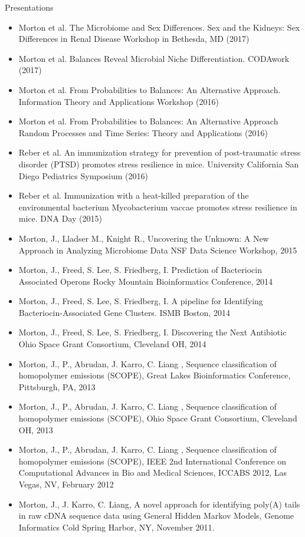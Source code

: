 \documentclass{resume} %
\begin{document}
\begin{rSection}{Presentations}
  \begin{itemize}
    \setlength\itemsep{0em}
    \item  Morton et al. The Microbiome and Sex Differences.
           Sex and the Kidneys: Sex Differences in Renal Disease Workshop in Bethesda, MD (2017)
    \item  Morton et al. Balances Reveal Microbial Niche Differentiation. CODAwork (2017)
    \item  Morton et al. From Probabilities to Balances: An Alternative Approach. Information Theory and Applications Workshop (2016)
    \item  Morton et al. From Probabilities to Balances: An Alternative Approach Random Processes and Time Series: Theory and Applications (2016)
    \item  Reber et al. An immunization strategy for prevention of post-traumatic stress disorder (PTSD) promotes stress resilience in mice.
                 University California San Diego Pediatrics Symposium  (2016)
    \item  Reber et al. Immunization with a heat-killed preparation of the environmental bacterium Mycobacterium vaccae
                promotes stress resilience in mice. DNA Day (2015)
    \item   Morton, J., Lladser M., Knight R., Uncovering the Unknown: A New Approach in
                Analyzing Microbiome Data NSF Data Science Workshop, 2015
    \item   Morton, J., Freed, S. Lee, S. Friedberg, I. Prediction of Bacteriocin Associated Operons
                Rocky Mountain Bioinformatics Conference, 2014
    \item   Morton, J., Freed, S. Lee, S. Friedberg, I. A pipeline for Identifying Bacteriocin-Associated
                Gene Clusters. ISMB Boston, 2014
    \item   Morton, J., Freed, S. Lee, S. Friedberg, I. Discovering the Next Antibiotic
                Ohio Space Grant Consortium, Cleveland OH, 2014
    \item   Morton, J., P., Abrudan, J. Karro, C. Liang , Sequence classification of homopolymer emissions
                (SCOPE), Great Lakes Bioinformatics Conference, Pittsburgh, PA, 2013
    \item   Morton, J., P., Abrudan, J. Karro, C. Liang , Sequence classification of homopolymer emissions
                (SCOPE), Ohio Space Grant Consortium, Cleveland OH, 2013
    \item   Morton, J., P., Abrudan, J. Karro, C. Liang , Sequence classification of homopolymer emissions
                (SCOPE), IEEE 2nd International Conference on Computational Advances in Bio and
                Medical Sciences, ICCABS 2012, Las Vegas, NV, February 2012
    \item   Morton, J., J. Karro, C. Liang, A novel approach for identifying poly(A) tails in
                raw cDNA sequence data using General Hidden Markov Models, Genome Informatics
                Cold Spring Harbor, NY, November 2011.
  \end{itemize}
\end{rSection}
\end{document}
